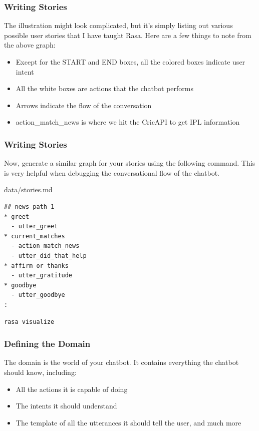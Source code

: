 \begin{frame}[fragile]\frametitle{Writing Stories}

 The illustration might look complicated, but it's simply listing out various possible user stories that I have taught Rasa. Here are a few things to note from the above graph:
 
 
\begin{itemize}
\item Except for the START and END boxes, all the colored boxes indicate user intent
\item All the white boxes are actions that the chatbot performs
\item  Arrows indicate the flow of the conversation
\item  action\_match\_news is where we hit the CricAPI to get IPL information
\end{itemize}
\end{frame}


\begin{frame}[fragile]\frametitle{Writing Stories}

Now, generate a similar graph for your stories using the following command. This is very helpful when debugging the conversational flow of the chatbot.

data/stories.md
\begin{lstlisting}
## news path 1
* greet
  - utter_greet
* current_matches
  - action_match_news
  - utter_did_that_help
* affirm or thanks
  - utter_gratitude
* goodbye
  - utter_goodbye
:
\end{lstlisting}

\begin{lstlisting}
rasa visualize
\end{lstlisting}
\end{frame}

 \begin{frame}[fragile]\frametitle{Defining the Domain}

The domain is the world of your chatbot. It contains everything the chatbot should know, including:
 
 
\begin{itemize}
\item All the actions it is capable of doing
\item The intents it should understand
\item The template of all the utterances it should tell the user, and much more
\end{itemize}
\end{frame}

